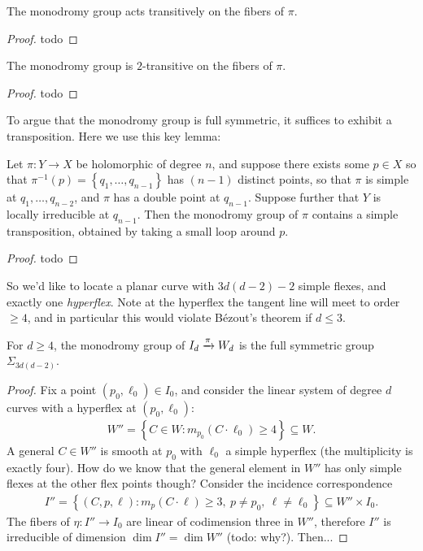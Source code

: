 \documentclass[11pt]{amsart}
\begin{document}
\begin{proposition}\label{prop:monodromy-flexes-transitive} 
The monodromy group acts transitively on the fibers of $\pi$.
\end{proposition}
\begin{proof} todo
\end{proof}


\begin{proposition} The monodromy group is $2$-transitive on the fibers of $\pi$.
\end{proposition}
\begin{proof} todo
\end{proof}


To argue that the monodromy group is full symmetric, it suffices to exhibit a transposition. Here we use this key lemma:

\begin{lemma} Let $\pi \colon Y \to X$ be holomorphic of degree $n$, and suppose there exists some $p\in X$ so that $\pi^{-1}(p) = \left\{ q_1, \ldots, q_{n-1} \right\}$ has $(n-1)$ distinct points, so that $\pi$ is simple at $q_1, \ldots, q_{n-2}$, and $\pi$ has a double point at $q_{n-1}$. Suppose further that $Y$ is locally irreducible at $q_{n-1}$. Then the monodromy group of $\pi$ contains a simple transposition, obtained by taking a small loop around $p$.
\end{lemma}
\begin{proof} todo
\end{proof}


So we'd like to locate a planar curve with $3d(d-2) - 2$ simple flexes, and exactly one \textit{hyperflex}. Note at the hyperflex the tangent line will meet to order $\ge 4$, and in particular this would violate B\'{e}zout's theorem if $d \le 3$.

\begin{theorem} For $d\ge 4$, the monodromy group of $I_d \xrightarrow{\pi} W_d$ is the full symmetric group $\Sigma_{3d(d-2)}$.
\end{theorem}
\begin{proof} Fix a point $(p_0,\ell_0) \in I_0$, and consider the linear system of degree $d$ curves with a hyperflex at $(p_0,\ell_0)$:
\begin{align*}
    W'' = \left\{ C \in W \colon m_{p_0}(C\cdot \ell_0) \ge 4 \right\} \subseteq W.
\end{align*}
A general $C \in W''$ is smooth at $p_0$ with $\ell_0$ a simple hyperflex (the multiplicity is exactly four). How do we know that the general element in $W''$ has only simple flexes at the other flex points though? Consider the incidence correspondence
\begin{align*}
    I'' = \left\{ (C,p,\ell) \colon m_p(C\cdot \ell) \ge3,\ p\ne p_0,\ \ell\ne \ell_0 \right\} \subseteq W'' \times I_0.
\end{align*}
The fibers of $\eta \colon I'' \to I_0$ are linear of codimension three in $W''$, therefore $I''$ is irreducible of dimension $\dim I'' = \dim W''$ (todo: why?). Then...
\end{proof}
\end{document}
